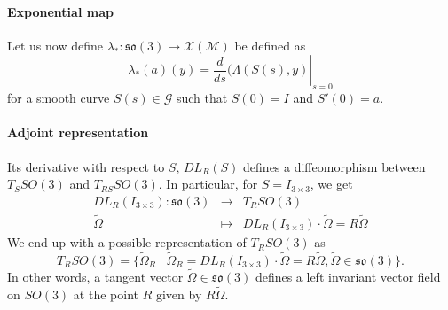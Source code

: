 \paragraph{Exponential map}
Let us now define $\lambda_* :  \mathfrak{so}(3) \rightarrow \mathcal X(\mathcal M)$ be defined as
\begin{equation}
  \label{eq:69}
  \lambda_*(a)(y) = \left. \frac{d}{ds} (\Lambda(S(s),y) \right|_{s=0}
\end{equation}
for a smooth curve  $S(s) \in \mathcal G$ such that $S(0) =I$ and $S'(0)=a$.


\paragraph{Adjoint representation}


Its derivative with respect to $S$, $DL_R(S)$ defines a diffeomorphism between $T_SSO(3)$ and $T_{RS}SO(3)$. In particular, for $S=I_{3\times3}$, we get
\begin{equation}
  \label{eq:49}
  \begin{array}{rcl}
    DL_R(I_{3\times3}) : \mathfrak{so}(3) & \rightarrow & T_R SO(3) \\
    \tilde \Omega &\mapsto &DL_R(I_{3\times3})\cdot \tilde \Omega = R \tilde \Omega
  \end{array}
\end{equation}
We end up with a possible representation of $T_{R} SO(3)$ as
\begin{equation}
  \label{eq:48}
  T_{R} SO(3) =\{\tilde \Omega_R \mid \tilde \Omega_R = DL_R(I_{3\times3})\cdot \tilde \Omega = R \tilde \Omega, \tilde \Omega \in\mathfrak{so}(3)  \}.
\end{equation}
In other words, a tangent vector $\tilde \Omega \in \mathfrak{so}(3)$ defines a left invariant vector field on $SO(3)$ at the point $R$ given by $R \tilde \Omega$.



